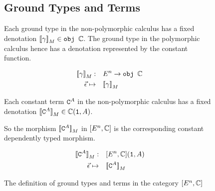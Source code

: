 \documentclass{Report}
\begin{document}
\begin{figure}
    \begin{framed}
        \subsection{Ground Types and Terms}
        Each ground type in the non-polymorphic calculus has a fixed denotation ${\bf [\![}\gamma{\bf ]\!]}_M\in\texttt{obj }\mathbb{C}$. The ground type in the polymorphic calculus hence has a denotation represented by the constant function.
        
        \begin{align}
            {\bf [\![}\gamma{\bf ]\!]}_M:&\quad E^n\rightarrow \texttt{obj }\mathbb{C}\\
            \vec{\epsilon} \mapsto&\quad  {\bf [\![}\gamma{\bf ]\!]}_M\\
        \end{align}
        
        Each constant term $\texttt{C}^{A}$ in the non-polymorphic calculus has a fixed denotation ${\bf [\![}\texttt{C}^{A}{\bf ]\!]}_M\in\mathbb{C}(\texttt{1}, A)$.
        
        So the morphism ${\bf [\![}\texttt{C}^{A}{\bf ]\!]}_M$ in $[E^n, \mathbb{C}]$ is the corresponding constant dependently typed morphism.
        
        \begin{align}
            {\bf [\![}\texttt{C}^{A}{\bf ]\!]}_M:&\quad[E^n, \mathbb{C}](\texttt{1}, A)\\
            \vec{\epsilon}\mapsto&\quad{\bf [\![}\texttt{C}^{A}{\bf ]\!]}_M
        \end{align}        
    \end{framed}
    \caption{The definition of ground types and terms in the category $[E^n, \mathbb{C}]$ }
    \label{HowToBuildGround}
\end{figure}
\end{document}

